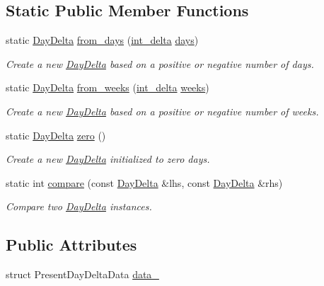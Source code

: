 \subsection*{Static Public Member Functions}
\begin{DoxyCompactItemize}
\item 
static \hyperlink{structDayDelta}{Day\-Delta} \hyperlink{structDayDelta_a7421a2d8448dd7d5329d72d0d6a04cbd}{from\-\_\-days} (\hyperlink{types_8h_a8a67cf99971c5cfeeaa2380ba84a4c92}{int\-\_\-delta} \hyperlink{structDayDelta_af7d15328d1c97bbd3316f014c69a6e3b}{days})
\begin{DoxyCompactList}\small\item\em Create a new \hyperlink{structDayDelta}{Day\-Delta} based on a positive or negative number of days. \end{DoxyCompactList}\item 
static \hyperlink{structDayDelta}{Day\-Delta} \hyperlink{structDayDelta_a871bbf34275016d74c7ef8c8777c3258}{from\-\_\-weeks} (\hyperlink{types_8h_a8a67cf99971c5cfeeaa2380ba84a4c92}{int\-\_\-delta} \hyperlink{structDayDelta_a48287489831fa9ec472451487908e663}{weeks})
\begin{DoxyCompactList}\small\item\em Create a new \hyperlink{structDayDelta}{Day\-Delta} based on a positive or negative number of weeks. \end{DoxyCompactList}\item 
static \hyperlink{structDayDelta}{Day\-Delta} \hyperlink{structDayDelta_acfcc09473305041a930a1ea6a3c20409}{zero} ()
\begin{DoxyCompactList}\small\item\em Create a new \hyperlink{structDayDelta}{Day\-Delta} initialized to zero days. \end{DoxyCompactList}\item 
static int \hyperlink{structDayDelta_a1059465fe1c1bfb8d7136ad887b00d30}{compare} (const \hyperlink{structDayDelta}{Day\-Delta} \&lhs, const \hyperlink{structDayDelta}{Day\-Delta} \&rhs)
\begin{DoxyCompactList}\small\item\em Compare two \hyperlink{structDayDelta}{Day\-Delta} instances. \end{DoxyCompactList}\end{DoxyCompactItemize}
\subsection*{Public Attributes}
\begin{DoxyCompactItemize}
\item 
struct Present\-Day\-Delta\-Data \hyperlink{structDayDelta_af256f16b6700e43995186eea83db9ebc}{data\-\_\-}
\end{DoxyCompactItemize}
